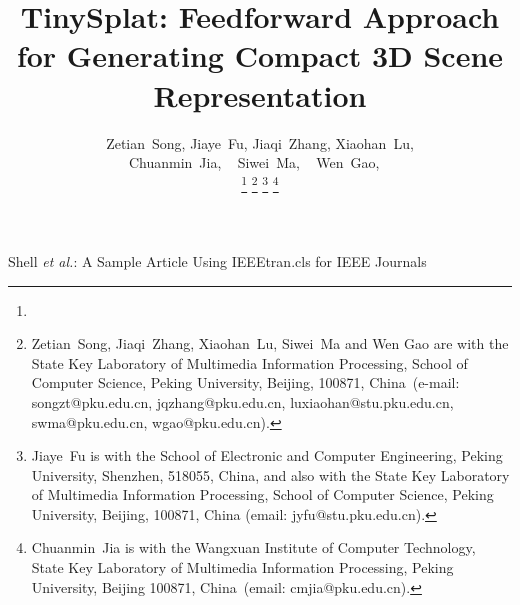 \documentclass[lettersize,journal]{IEEEtran}
\begin{document}
\title{TinySplat: Feedforward Approach for Generating Compact 3D Scene Representation}

\author{
	Zetian~Song,
        Jiaye~Fu,
	Jiaqi~Zhang,
        Xiaohan~Lu,\\
        Chuanmin~Jia, ~
	Siwei~Ma, ~
	Wen~Gao, ~\\	
		\thanks{
		}
        \thanks{Zetian~Song, Jiaqi~Zhang, Xiaohan~Lu, Siwei~Ma and Wen Gao are with the State Key Laboratory of Multimedia Information Processing, School of Computer Science, Peking University, Beijing, 100871, China~(e-mail: songzt@pku.edu.cn, jqzhang@pku.edu.cn, luxiaohan@stu.pku.edu.cn, swma@pku.edu.cn, wgao@pku.edu.cn). }
        \thanks{Jiaye~Fu is with the School of Electronic and Computer Engineering, Peking University, Shenzhen, 518055, China, and also with the State Key Laboratory of Multimedia Information Processing, School of Computer Science, Peking University, Beijing, 100871, China (email: jyfu@stu.pku.edu.cn).}
        \thanks{Chuanmin~Jia is with the Wangxuan Institute of Computer Technology, State Key Laboratory of Multimedia Information Processing, Peking University, Beijing 100871, China~(email: cmjia@pku.edu.cn).}
	}

%
{Shell \MakeLowercase{\textit{et al.}}: A Sample Article Using IEEEtran.cls for IEEE Journals}

\end{document}
